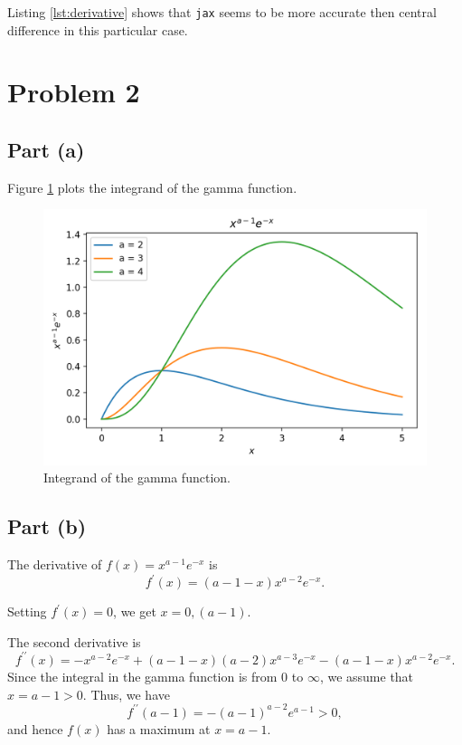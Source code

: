 \documentclass[11pt]{article}
\begin{document}
Listing \ref{lst:derivative} shows that \texttt{jax} seems to be more accurate then central difference in this particular case.


\section{Problem 2}
\subsection{Part (a)}
Figure \ref{fig:integrand} plots the integrand of the gamma function.
\begin{figure}[H]
    \centering
    \includegraphics[scale = 0.8]{images/ps-5-2a.png}
    \caption{Integrand of the gamma function.}
    \label{fig:integrand}
\end{figure}

\subsection{Part (b)}
The derivative of $f(x) = x^{a-1}e^{-x}$ is
\begin{equation}
    f^{\prime}(x) = (a-1-x)x^{a-2}e^{-x}.
\end{equation}

Setting $f^{\prime}(x) = 0$, we get $x = 0, (a-1)$.

The second derivative is
\begin{equation}
    f^{\prime\prime}(x) = -x^{a-2}e^{-x} + (a-1-x)(a-2)x^{a-3}e^{-x} - (a-1-x)x^{a-2}e^{-x}.
\end{equation}
Since the integral in the gamma function is from 0 to $\infty$, we assume that $x = a - 1 > 0$. Thus, we have
\begin{equation}
    f^{\prime\prime}(a-1) = -(a-1)^{a-2}e^{a-1} > 0,
\end{equation}
and hence $f(x)$ has a maximum at $x = a-1$.
\end{document}

